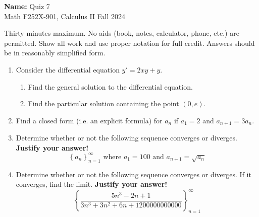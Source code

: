 \documentclass[12pt]{article}
\begin{document}
\pagestyle{plain}

\noindent \textbf{Name:} \underline{\hspace{15em}}		\hfill	Quiz 7 \\
           Math F252X-901, Calculus II  			\hfill	Fall 2024 	

                \vspace{1cm}
                
Thirty minutes maximum. No aids (book, notes,
calculator, phone, etc.) are permitted. Show all work and use proper
notation for full credit. Answers should be in reasonably simplified
form.

\begin{enumerate}

\item Consider the differential equation $y' = 2xy + y$.
  \begin{enumerate} 
  \item Find the general solution to the differential equation.
    \vfill
  \item Find the particular solution containing the point $(0,e)$.
    \vfill
  \end{enumerate}

\item Find a closed form (i.e. an explicit formula) for $a_n$ if $a_1
  = 2$ and $a_{n+1} = 3a_n$.
  \vfill

  \newpage
  
\item Determine whether or not the following sequence converges or
  diverges. {\bf Justify your answer!}
  \[
    \left\{ a_n \right\}_{n=1}^{\infty} \textrm{ where } a_1 = 100 \textrm{ and } a_{n+1} = \sqrt{a_n}
  \]
  \vfill

\item Determine whether or not the following sequence converges or
  diverges. If it converges, find the limit. {\bf Justify your
    answer!}
  \[
    \left\{ \frac{5n^3-2n+1}{3n^3+3n^2+6n+1200000000000} \right\}_{n=1}^{\infty}
  \]

  \vfill
  
\end{enumerate}
\end{document}
